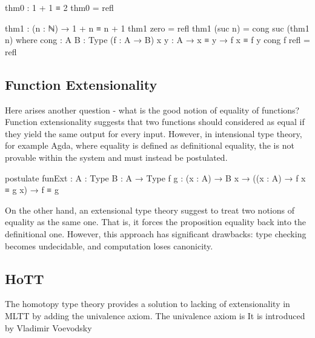 \begin{code}
thm0 : 1 + 1 ≡ 2
thm0 = refl

thm1 : (n : ℕ) → 1 + n ≡ n + 1
thm1 zero = refl
thm1 (suc n) = cong suc (thm1 n)
  where
  cong : {A B : Type} (f : A → B) {x y : A} → x ≡ y → f x ≡ f y
  cong f refl = refl
\end{code}

\subsection*{Function Extensionality}

Here arises another question - what is the good notion of equality of functions? Function extensionality suggests that two functions should considered as equal if they yield the same output for every input. However, in intensional type theory, for example Agda, where equality is defined as definitional equality, the  is not provable within the system and must instead be postulated.

\begin{code}
postulate
  funExt : {A : Type} {B : A → Type} {f g : (x : A) → B x} →
           ((x : A) → f x ≡ g x) → f ≡ g
\end{code}

On the other hand, an extensional type theory suggest to treat two notions of equality as the same one. That is, it forces the proposition equality back into the definitional one. However, this approach has significant drawbacks: type checking becomes undecidable, and computation loses canonicity.

\subsection*{HoTT}

The homotopy type theory provides a solution to lacking of extensionality in MLTT by adding the univalence axiom. The univalence axiom is It is introduced by Vladimir Voevodsky